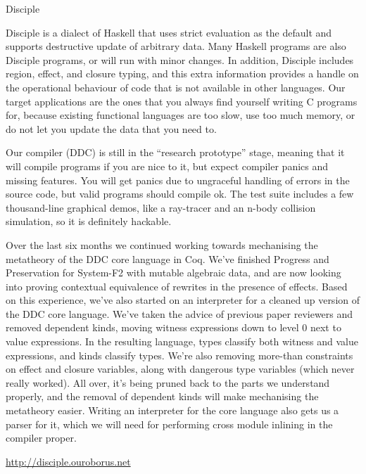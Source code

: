 \begin{hcarentry}[section]{Disciple}
\makeheader

Disciple is a dialect of Haskell that uses strict evaluation as the default and supports destructive update of arbitrary data.  Many Haskell programs are also Disciple programs, or will run with minor changes. In addition, Disciple includes region, effect, and closure typing, and this extra information provides a handle on the operational behaviour of code that is not available in other languages. Our target applications are the ones that you always find yourself writing C programs for, because existing functional languages are too slow, use too much memory, or do not let you update the data that you need to.

Our compiler (DDC) is still in the ``research prototype'' stage, meaning that it will compile programs if you are nice to it, but expect compiler panics and missing features. You will get panics due to ungraceful handling of errors in the source code, but valid programs should compile ok. The test suite includes a few thousand-line graphical demos, like a ray-tracer and an n-body collision simulation, so it is definitely hackable.

Over the last six months we continued working towards mechanising the metatheory of the DDC core language in Coq. We've finished Progress and Preservation for System-F2 with mutable algebraic data, and are now looking into proving contextual equivalence of rewrites in the presence of effects. Based on this experience, we've also started on an interpreter for a cleaned up version of the DDC core language. We've taken the advice of previous paper reviewers and removed dependent kinds, moving witness expressions down to level 0 next to value expressions. In the resulting language, types classify both witness and value expressions, and kinds classify types. We're also removing more-than constraints on effect and closure variables, along with dangerous type variables (which never really worked). All over, it's being pruned back to the parts we understand properly, and the removal of dependent kinds will make mechanising the metatheory easier. Writing an interpreter for the core language also gets us a parser for it, which we will need for performing cross module inlining in the compiler proper.

\FurtherReading
  \url{http://disciple.ouroborus.net}
\end{hcarentry}
